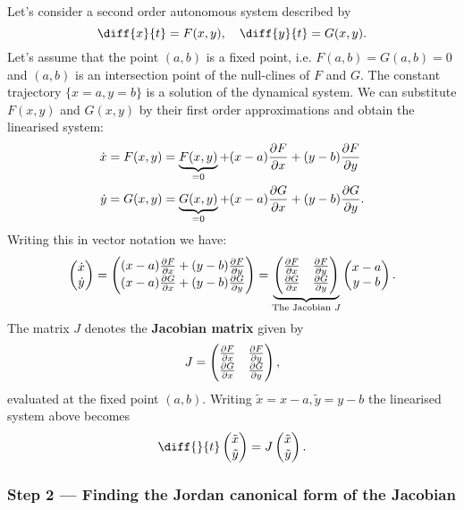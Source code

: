 \documentclass[12pt, a4paper]{article}
\theoremstyle{definition}
\theoremstyle{plain}
\begin{document}
Let’s consider a second order autonomous system described by $$\diff{x}{t}=F(x,y), \quad \diff{y}{t}=G(x,y).$$ Let’s assume that the point $(a,b)$ is a fixed point, i.e. $F(a,b) = G(a,b) = 0$ and $(a,b)$ is an intersection point of the null-clines of $F$ and $G.$ The constant trajectory $\{x = a, y = b\}$ is a solution of the dynamical system. We can substitute $F(x,y)$ and $G(x,y)$ by their first order approximations and obtain the linearised system: 
$$\begin{aligned}
\dot{x}&=F(x,y)=\underbrace{F(x,y)}_{=0}+(x-a)\pdv{F}{x}+(y-b)\pdv{F}{y} \\
\dot{y}&=G(x,y)=\underbrace{G(x,y)}_{=0}+(x-a)\pdv{G}{x}+(y-b)\pdv{G}{y}.
\end{aligned}$$ Writing this in vector notation we have: $$\begin{pmatrix} \dot{x} \\\dot{y} \end{pmatrix}= \begin{pmatrix} (x-a)\pdv{F}{x}+(y-b)\pdv{F}{y} \\ (x-a)\pdv{G}{x}+(y-b)\pdv{G}{y} \end{pmatrix} = \underbrace{\begin{pmatrix} \pdv{F}{x} & \pdv{F}{y} \\ \pdv{G}{x} & \pdv{G}{y} \end{pmatrix}}_{\text{The Jacobian $J$}}\begin{pmatrix} x-a \\ y-b \end{pmatrix}.$$ The matrix $J$ denotes the \textbf{Jacobian matrix} given by $$J=\begin{pmatrix} \pdv{F}{x} & \pdv{F}{y} \\ \pdv{G}{x} & \pdv{G}{y} \end{pmatrix},$$ evaluated at the fixed point $(a,b).$ Writing $\tilde{x}=x-a, \tilde{y}=y-b$ the linearised system above becomes $$ \diff{}{t}\begin{pmatrix} \tilde{x} \\\tilde{y} \end{pmatrix}=J \begin{pmatrix} \tilde{x}\\\tilde{y} \end{pmatrix}.$$

\subsubsection*{Step 2 — Finding the Jordan canonical form of the Jacobian}
\end{document}
